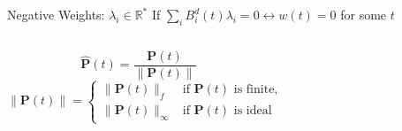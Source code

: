 \documentclass[aspectratio=169, 10pt]{beamer}
\begin{document}

\begin{frame}[t]{Negative Weights: $\lambda_i \in \mathbb{R}^*$}
    \setlength{\columnsep}{20pt}
    If $\sum_i B_i^d(t) \lambda_i =0 \leftrightarrow w(t)=0$ for some $t$  

    
    \begin{columns}[T]
        


        
       \vspace{0.8cm}

        {
        \[
        \hat{\mathbf{P}}(t) = \displaystyle\frac{\mathbf{P}(t)}{\|\mathbf{P}(t)\|} \quad
        \]
        \[
            \|\mathbf{P}(t)\| = \begin{cases} 
            \|\mathbf{P}(t)\|_f & \text{if } \mathbf{P}(t) \text{ is finite,} \\
            \|\mathbf{P}(t)\|_\infty & \text{if } \mathbf{P}(t) \text{ is ideal}
        \end{cases}
        \]
        }
        
           


\end{columns}
\end{frame}
\end{document}
